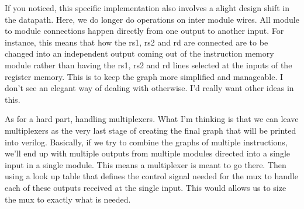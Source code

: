 \documentclass[]{article}
\begin{document}
	If you noticed, this specific implementation also involves a alight design shift in the datapath. Here, we do longer do operations on inter module wires. All module to module connections happen directly from one output to another input. For instance, this means that how the rs1, rs2 and rd are connected are to be changed into an independent output coming out of the instruction memory module rather than having the rs1, rs2 and rd lines selected at the inputs of the register memory.
	This is to keep the graph more simplified and manageable. I don't see an elegant way of dealing with otherwise. I'd really want other ideas in this.

	
	As for a hard part, handling multiplexers. What I'm thinking is that we can leave multiplexers as the very last stage of creating the final graph that will be printed into verilog.
	Basically, if we try to combine the graphs of multiple instructions, we'll end up with multiple outputs from multiple modules directed into a single input in a single module.
	This means a multiplexer is meant to go there. Then using a look up table that defines the control signal needed for the mux to handle each of these outputs received at the single input.
	This would allows us to size the mux to exactly what is needed.
	
\end{document}
